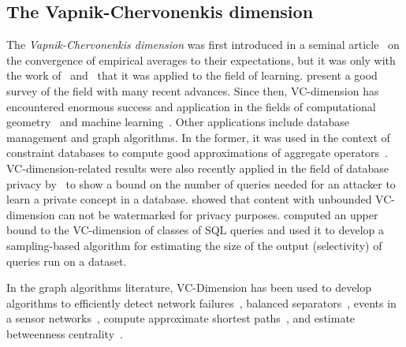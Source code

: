 \subsection{The Vapnik-Chervonenkis dimension}\label{sec:prevworkvc}
The {\em Vapnik-Chervonenkis dimension} was first introduced in a seminal
article~\citep{VapnikC71} on the convergence of empirical averages to their
expectations, but it was only with the work of~\citet{HausslerW86}
and~\citet{BlumerEHW89} that it was applied to the field of learning.
\citet{BoucheronBL05} present a good survey of the field with many recent
advances. Since then, VC-dimension has encountered enormous success and
application in the fields of computational
geometry~\citep{Chazelle00,Matousek02} and machine
learning~\citep{AnthonyB99,DevroyeGL96}. Other applications include database
management and graph algorithms.  In the former, it was used in the context of
constraint databases to compute good approximations of aggregate
operators~\citep{BenediktL02}. VC-dimension-related results were also recently
applied in the field of database privacy by~\citet{BlumLR08} to show a bound on
the number of queries needed for an attacker to learn a private concept in a
database. \citet{Gross11} showed that content with unbounded VC-dimension can
not be watermarked for privacy purposes.  \citet{RiondatoACZU11} computed an
upper bound to the VC-dimension of classes of SQL queries and used it to develop
a sampling-based algorithm for estimating the size of the output (selectivity)
of queries run on a dataset.

 In the
graph algorithms literature, VC-Dimension has been used to develop algorithms to
efficiently detect network failures~\citep{Kleinberg03,KleinbergSS08}, balanced
separators~\citep{FeigeM06}, events in a sensor networks~\citep{GandhiSW10},
compute approximate shortest paths~\citep{AbrahamDFGW11}, and estimate
betweenness centrality~\citep{RiondatoK14}.
